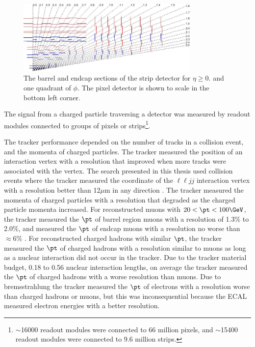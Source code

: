 \begin{figure}[ht]
	\centering
	\includegraphics[width=0.8\textwidth]{figures/siliconStripAndPixelDetectorTwoDimView.png}
	\caption{The barrel and endcap sections of the strip detector for $\eta \geq 0.$ and one quadrant of $\phi$.  
	The pixel detector is shown to scale in the bottom left corner.}
	\label{fig:stripTracker}
\end{figure}

The signal from a charged particle traversing a detector was measured by readout modules connected to groups of pixels or 
strips\footnote{$\sim$16000 readout modules were connected to 66 million pixels, and $\sim$15400 readout modules were connected 
to 9.6 million strips.}.

The tracker performance depended on the number of tracks in a collision event, and the momenta of 
charged particles.  The tracker measured the position of an interaction vertex with a resolution that improved when more 
tracks were associated with the vertex.  The search presented in this thesis used collision events where the tracker 
measured the coordinate of the $\ell\ell jj$ interaction vertex with a resolution better than 12$\mu$m in any direction \cite{trackerPerformanceInCollisions}.  
The tracker measured the momenta of charged particles with a resolution that degraded as the charged particle momenta 
increased.  For reconstructed muons with $20 < \pt < 100\GeV$, the tracker measured the $\pt$ of barrel region muons with a 
resolution of 1.3\% to 2.0\%, and measured the $\pt$ of endcap muons with a resolution no worse than $\approx$6\% \cite{muonRecoFirstCollisions}.  
For reconstructed charged hadrons with similar $\pt$, the tracker measured the $\pt$ of charged hadrons with a resolution 
similar to muons as long as a nuclear interaction did not occur in the tracker. Due to the tracker material budget, 0.18 
to 0.56 nuclear interaction lengths, on average the tracker measured the 
$\pt$ of charged hadrons with a worse resolution than muons.  Due to bremsstrahlung the tracker measured the $\pt$ of 
electrons with a resolution worse than charged hadrons or muons, but this was inconsequential because the ECAL measured 
electron energies with a better resolution.

